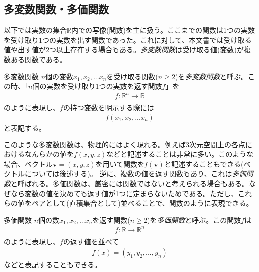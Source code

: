 \subsection{多変数関数・多価関数}
以下では実数の集合\(\mathbb{R}\)内での写像(関数)を主に扱う。ここまでの関数は1つの実数を受け取り1つの実数を出す関数であった。これに対して、本文書では受け取る値や出す値が2つ以上存在する場合もある。\emph{多変数関数}は受け取る値(変数)が複数ある関数である。
\begin{definition*}{多変数関数}
	\(n\)個の変数\(x_1,x_2,...x_n\)を受け取る関数(\(n\geq 2\))を\emph{多変数関数}と呼ぶ。この時、「\(n\)個の実数を受け取り1つの実数を返す関数\(f\)」を
	\begin{equation}
		\begin{aligned}
			f: \mathbb{R}^n\rightarrow \mathbb{R} \\
		\end{aligned}
	\end{equation}
	のように表現し、\(f\)の持つ変数を明示する際には
	\begin{equation}
		\begin{aligned}
			f(x_1,x_2,...x_n)
		\end{aligned}
	\end{equation}
	と表記する。
\end{definition*}
このような多変数関数は、物理的にはよく現れる。例えば3次元空間上の各点におけるなんらかの値を\(f(x,y,z)\)などと記述することは非常に多い。このような場合、ベクトル\(\boldsymbol{v}=(x,y,z)\)を用いて関数を\(f(\boldsymbol{v})\)と記述することもできる(ベクトルについては後述する)。
逆に、複数の値を返す関数もあり、これは\emph{多価関数}と呼ばれる。多価関数は、厳密には関数ではないと考えられる場合もある。なぜなら変数の値を決めても返す値が1つに定まらないためである。ただし、これらの値をペアとして(直積集合として)並べることで、関数のように表現できる。
\begin{definition*}{多価関数}
	\(n\)個の数\(x_1,x_2,...x_n\)を返す関数(\(n\geq 2\))を\emph{多価関数}と呼ぶ。この関数\(f\)は
	\begin{equation}
		\begin{aligned}
			f: \mathbb{R}\rightarrow \mathbb{R}^n \\
		\end{aligned}
	\end{equation}
	のように表現し、\(f\)の返す値を並べて
	\begin{equation}
		\begin{aligned}
			f(x)=(y_1,y_2,...,y_n)
		\end{aligned}
	\end{equation}
	などと表記することもできる。
\end{definition*}
